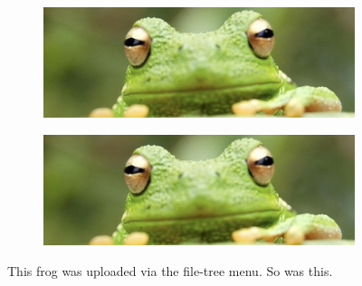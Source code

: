\documentclass[twocolumn, 9pt]{extarticle}
\begin{document}
\begin{figure}[ht]
\centering
\begin{subfigure}[b]{0.75\linewidth}
    \includegraphics[width=\linewidth]{frog2.jpg}
    \caption{}
    \label{subfig:frog2a}
\end{subfigure}

\begin{subfigure}[b]{0.75\linewidth}
    \includegraphics[width=\linewidth]{frog2.jpg}
    \caption{}
    \label{subfig:frog2b}
\end{subfigure}
\caption{\textbf{} This frog was uploaded via the file-tree menu. \textbf{} So was this. }
\label{fig:frog_a_b}
\end{figure}
\end{document}
